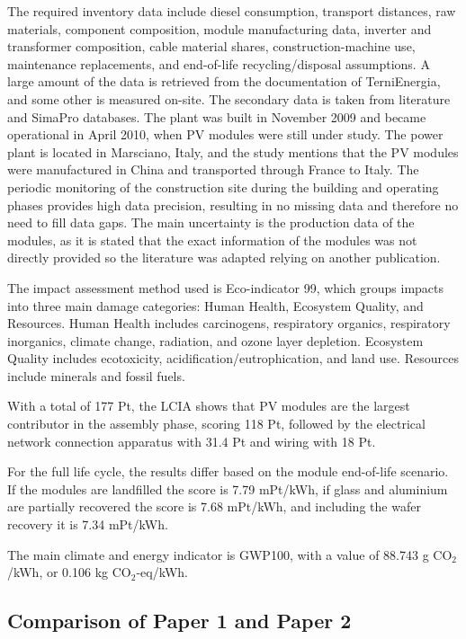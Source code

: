 \documentclass[9pt]{extarticle}
\begin{document}
The required inventory data include diesel consumption, transport distances,
raw materials, component composition, module manufacturing data, inverter and
transformer composition, cable material shares, construction-machine use, maintenance
replacements, and end-of-life recycling/disposal assumptions. A large amount of the
data is retrieved from the documentation of TerniEnergia, and some other is
measured on-site. The secondary data is taken from literature and SimaPro databases.
The plant was built in November 2009 and became operational in April 2010, when
PV modules were still under study. The power plant is located in
Marsciano, Italy, and the study mentions that the PV modules were
manufactured in China and transported through France to Italy.
The periodic monitoring of the construction site during the
building and operating phases provides high data precision,
resulting in no missing data and therefore no need to fill data
gaps. The main uncertainty is the production data of the modules,
as it is stated that the exact information of the modules was not
directly provided so the literature was adapted relying on another
publication.

The impact assessment method used is Eco-indicator 99, which
groups impacts into three main damage categories: Human Health,
Ecosystem Quality, and Resources.
Human Health includes carcinogens, respiratory organics,
respiratory inorganics, climate change, radiation, and ozone layer
depletion. Ecosystem Quality includes ecotoxicity,
acidification/eutrophication, and land use. Resources include
minerals and fossil fuels.

With a total of 177 Pt, the LCIA shows that PV modules are the
largest contributor in the assembly phase, scoring 118 Pt,
followed by the electrical network connection apparatus with 31.4
Pt and wiring with 18 Pt.

For the full life cycle, the results differ based on the module
end-of-life scenario. If the modules are landfilled the score is
7.79 mPt/kWh, if glass and aluminium are partially recovered the
score is 7.68 mPt/kWh, and including the wafer recovery it is 7.34
mPt/kWh.

The main climate and energy indicator is GWP100, with a value of
88.743 g CO$_2$/kWh, or 0.106 kg CO$_2$-eq/kWh.


\subsection{Comparison of Paper 1 and Paper 2}
\end{document}
